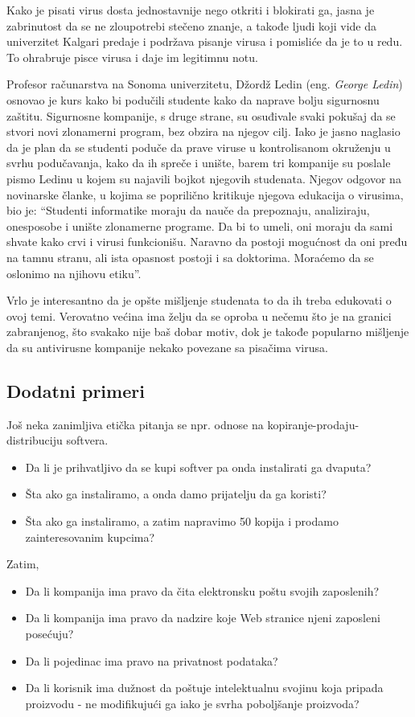 \documentclass[a4paper]{article}
\begin{document}
Kako je pisati virus dosta jednostavnije nego otkriti i blokirati ga, jasna je zabrinutost da se ne zloupotrebi stečeno znanje, a takođe ljudi koji vide da univerzitet Kalgari predaje i podržava pisanje virusa i pomisliće da je to u redu. 
To ohrabruje pisce virusa i daje im legitimnu notu.

Profesor računarstva na Sonoma univerzitetu, Džordž Ledin (eng. \textit{George Ledin}) osnovao je kurs kako bi podučili studente kako da naprave bolju sigurnosnu zaštitu. Sigurnosne kompanije, s druge strane, su osuđivale
svaki pokušaj da se stvori novi zlonamerni program, bez obzira na njegov cilj. Iako je jasno naglasio da je plan da se studenti poduče da prave viruse u kontrolisanom okruženju u svrhu podučavanja, kako da
ih spreče i unište, barem tri kompanije su poslale pismo Ledinu u kojem su najavili bojkot njegovih studenata.
Njegov odgovor na novinarske članke, u kojima se poprilično kritikuje njegova edukacija o virusima, bio je: ``Studenti informatike moraju da nauče da prepoznaju, analiziraju, onesposobe i unište zlonamerne programe.
Da bi to umeli, oni moraju da sami shvate kako crvi i virusi funkcionišu. Naravno da postoji mogućnost da oni pređu na tamnu stranu, ali ista opasnost postoji i sa doktorima. Moraćemo da se oslonimo na njihovu etiku''.


Vrlo je interesantno da je opšte mišljenje studenata to da ih treba edukovati o ovoj temi. Verovatno većina ima želju da se oproba u nečemu što je na granici zabranjenog, što svakako nije baš dobar motiv,
dok je takođe popularno mišljenje da su antivirusne kompanije nekako povezane sa pisačima virusa.

\subsection{Dodatni primeri}
Još neka zanimljiva etička pitanja se npr. odnose na kopiranje-prodaju-distribuciju softvera.
\begin{itemize}
\item Da li je prihvatljivo da se kupi softver pa onda instalirati ga dvaputa?
\item Šta ako ga instaliramo, a onda damo prijatelju da ga koristi?
\item Šta ako ga instaliramo, a zatim napravimo 50 kopija i prodamo zainteresovanim kupcima?
\end{itemize}
Zatim,
\begin{itemize} 
\item Da li kompanija ima pravo da čita elektronsku poštu svojih zaposlenih?
\item Da li kompanija ima pravo da nadzire koje Web stranice njeni zaposleni posećuju?
\item Da li pojedinac ima pravo na privatnost podataka?
\item Da li korisnik ima dužnost da poštuje intelektualnu svojinu koja pripada proizvodu - ne modifikujući ga iako je svrha poboljšanje proizvoda?
\end{itemize}
\end{document}
